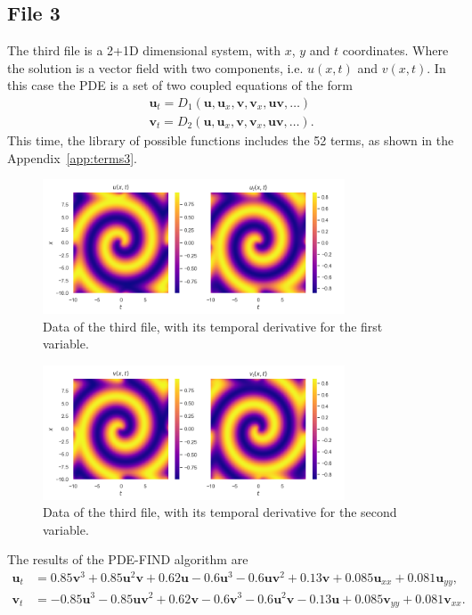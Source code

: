 \documentclass[unicode,11pt,a4paper,oneside,numbers=endperiod,openany]{scrartcl}
\begin{document}
\subsection*{File 3}
The third file is a 2+1D dimensional system, with $x$, $y$ and $t$ coordinates.
Where the solution is a vector
field with two components, i.e. $u(x, t)$ and $v(x, t)$. In this case the PDE is a set of two coupled
equations of the form
\begin{align}
    \mathbf{u}_t = D_1(\mathbf{u}, \mathbf{u}_x, \mathbf{v}, \mathbf{v}_x, \mathbf{u} \mathbf{v}, \ldots) \\
    \mathbf{v}_t = D_2(\mathbf{u}, \mathbf{u}_x, \mathbf{v}, \mathbf{v}_x, \mathbf{u} \mathbf{v}, \ldots).
\end{align}
This time, the library of possible functions includes the 52 terms, as shown in
the Appendix~\ref{app:terms3}.
\begin{figure}[h]
    \centering
    \includegraphics[width=0.8\textwidth]{../Task2/figures/data_u_3.png}
    \caption{Data of the third file, with its temporal derivative for the first variable.}
\end{figure}
\begin{figure}[h]
    \centering
    \includegraphics[width=0.8\textwidth]{../Task2/figures/data_v_3.png}
    \caption{Data of the third file, with its temporal derivative for the second variable.}
\end{figure}
The results of the PDE-FIND algorithm are
\begin{align}
    \mathbf{u}_t &= 0.85 \mathbf{v}^3 + 0.85 \mathbf{u}^2 \mathbf{v} + 0.62 \mathbf{u} - 0.6 \mathbf{u}^3 - 0.6 \mathbf{u} \mathbf{v}^2 + 0.13 \mathbf{v} + 0.085 \mathbf{u}_{xx} + 0.081 \mathbf{u}_{yy}, \\
    \mathbf{v}_t &= -0.85 \mathbf{u}^3 - 0.85 \mathbf{u} \mathbf{v}^2 + 0.62 \mathbf{v} - 0.6 \mathbf{v}^3 - 0.6 \mathbf{u}^2 \mathbf{v} - 0.13 \mathbf{u} + 0.085 \mathbf{v}_{yy} + 0.081 \mathbf{v}_{xx}.
\end{align}
\end{document}
